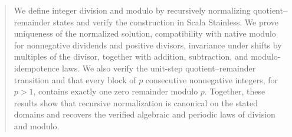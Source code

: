 \begin{abstract}
We define integer division and modulo by recursively normalizing
quotient--remainder states and verify the construction in Scala Stainless. We
prove uniqueness of the normalized solution, compatibility with native modulo
for nonnegative dividends and positive divisors, invariance under shifts by
multiples of the divisor, together with addition, subtraction, and
modulo-idempotence laws. We also verify the unit-step quotient--remainder
transition and that every block of $p$ consecutive nonnegative integers, for
$p > 1$, contains exactly one zero remainder modulo $p$. Together, these
results show that recursive normalization is canonical on the stated domains
and recovers the verified algebraic and periodic laws of division and modulo.
\end{abstract}
